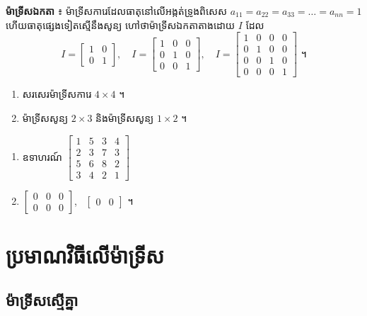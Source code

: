 \textbf{ម៉ាទ្រីសឯកតា} ៖ ម៉ាទ្រីសការេដែលធាតុនៅលើអង្កត់ទ្រូងពិសេស $a_{11} = a_{22} = a_{33} = \ldots = a_{nn} = 1$ ហើយធាតុផ្សេងទៀតស្មើនឹងសូន្យ ហៅថាម៉ាទ្រីសឯកតាតាងដោយ $I$ ដែល
\[ I = \begin{bmatrix} 1 & 0\\ 0 & 1 \end{bmatrix}, \quad I = \begin{bmatrix} 1 & 0 & 0\\ 0 & 1 & 0\\ 0 & 0 & 1 \end{bmatrix}, \quad I = \begin{bmatrix} 1 & 0 & 0 & 0\\ 0 & 1 & 0 & 0\\ 0 & 0 & 1 & 0\\ 0 & 0 & 0 & 1 \end{bmatrix} \text{ ។} \]

\begin{pro}
\begin{enumerate}[1]
  \item សរសេរម៉ាទ្រីសការេ $4 \times 4$ ។
  \item ម៉ាទ្រីសសូន្យ $2 \times 3$ និងម៉ាទ្រីសសូន្យ $1 \times 2$ ។
\end{enumerate}
\ans
\begin{enumerate}[1]
  \item ឧទាហរណ៍ $\begin{bmatrix} 1 & 5 & 3 & 4\\ 2 & 3 & 7 & 3\\ 5 & 6 & 8 & 2\\ 3 & 4 & 2 & 1 \end{bmatrix}$
  \item $\begin{bmatrix} 0 & 0 & 0\\ 0 & 0 & 0 \end{bmatrix}$, \ $\begin{bmatrix} 0 & 0 \end{bmatrix}$ ។
\end{enumerate}
\end{pro}

\section{ប្រមាណវិធីលើម៉ាទ្រីស}

\subsection{ម៉ាទ្រីសស្មើគ្នា}

